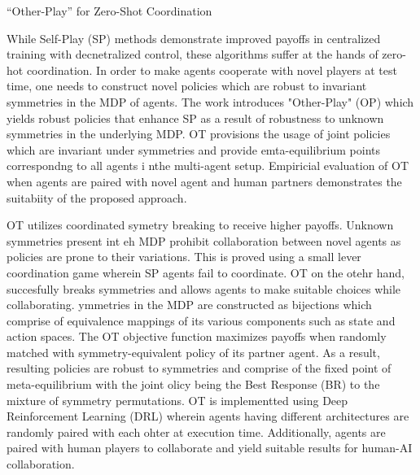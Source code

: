 \documentclass[11pt,letterpaper]{article}
\begin{document}
\begin{center}
  \large{“Other-Play” for Zero-Shot Coordination}
\end{center}

While Self-Play (SP) methods demonstrate improved payoffs in centralized training with decnetralized control, these algorithms suffer at the hands of zero-hot coordination. In order to make agents cooperate with novel players at test time, one needs to construct novel policies which are robust to invariant symmetries in the MDP of agents. The work introduces "Other-Play" (OP) which yields robust policies that enhance SP as a result of robustness to unknown symmetries in the underlying MDP. OT provisions the usage of joint policies which are invariant under symmetries and provide emta-equilibrium points correspondng to all agents i nthe multi-agent setup. Empiricial evaluation of OT when agents are paired with novel agent and human partners demonstrates the suitabiity of the proposed approach. 

OT utilizes coordinated symetry breaking to receive higher payoffs. Unknown symmetries present int eh MDP prohibit collaboration between novel agents as policies are prone to their variations. This is proved using a small lever coordination game wherein SP agents fail to coordinate. OT on the otehr hand, succesfully breaks symmetries and allows agents to make suitable choices while collaborating. ymmetries in the MDP are constructed as bijections which comprise of equivalence mappings of its various components such as state and action spaces. The OT objective function maximizes payoffs when randomly matched with  symmetry-equivalent policy of its partner agent. As a result, resulting policies are robust to symmetries and comprise of the fixed point of meta-equilibrium with the joint olicy being the Best Response (BR) to the mixture of symmetry permutations. OT is implementted using Deep Reinforcement Learning (DRL) wherein agents having different architectures are randomly paired with each ohter at execution time. Additionally, agents are paired with human players to collaborate and yield suitable results for human-AI collaboration. 
\end{document}
